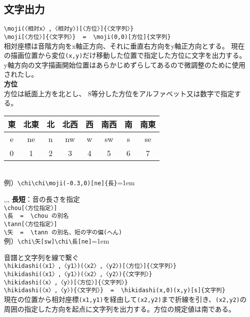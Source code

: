 \documentclass[a4paper,luatex]{l3doc}
\begin{document}
\subsection{文字出力}
\begin{function}{\moji}
 \verb|\moji(〈相対x〉,〈相対y〉)[〈方位〉]{〈文字列〉}|\\
 \verb|\moji[〈方位〉]{〈文字列〉}  =  \moji(0,0)[方位]{文字列}|\\
 相対座標は音階方向をx軸正方向、それに垂直右方向をy軸正方向とする。
 現在の描画位置から変位\verb|(x,y)|だけ移動した位置で指定した方位に文字を出力する。
 y軸方向の文字描画開始位置はあらかじめずらしてあるので微調整のために使用されたし。\\
\textbf{方位}\\
 方位は紙面上方を北とし、 8等分した方位をアルファベット又は数字で指定する。\\
 \begin{tabular}{|c|c|c|c|c|c|c|c|}\hline
  東&北東&北&北西&西&南西&南&南東\\\hline
  e&ne&n&nw&w&sw&s&se\\\hline
  0&1&2&3&4&5&6&7\\\hline
 \end{tabular}\\
 例）\verb|\chi\chi\moji(-0.3,0)[ne]{長}|\hspace{2em}\tanni=1em
\end{function}
\begin{function}{\chou,\長,\tann,\矢}
 \textbf{長短}：音の長さを指定\\
 \verb|\chou[〈方位指定〉]|\\
 \verb|\長  =  \chou の別名|\\
 \verb|\tann[〈方位指定〉]|\\
 \verb|\矢  =  \tann の別名、短の字の偏(へん)|\\
 例）\verb|\chi\矢[sw]\chi\長[ne]|\hspace{2em}\tanni=1em\hakase{\chi\矢[sw]\chi\長[ne]}
\end{function}

\begin{function}{\hikidashi}
音譜と文字列を線で繋ぐ\\
 \verb|\hikidashi(〈x1〉,〈y1〉)(〈x2〉,〈y2〉)[〈方位〉]{〈文字列〉}|\\
 \verb|\hikidashi(〈x1〉,〈y1〉)(〈x2〉,〈y2〉){〈文字列〉}|\\
 \verb|\hikidashi(〈x〉,〈y〉)[〈方位〉]{〈文字列〉}|\\
 \verb|\hikidashi(〈x〉,〈y〉){〈文字列〉}  =  \hikidashi(x,0)(x,y)[s]{文字列}|\\
現在の位置から相対座標\verb|(x1,y1)|を経由して\verb|(x2,y2)|まで折線を引き、\verb|(x2,y2)|の周囲の指定した方向を起点に文字列を出力する。方位の規定値は南である。
\end{function}
\end{document}
